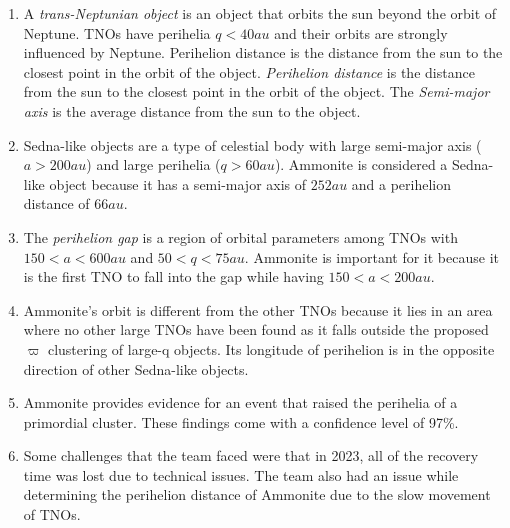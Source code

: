 \documentclass{article}
\theoremstyle{plain}
\begin{document}
\begin{enumerate}
          \begin{enumerate}[label=(\alph*)]
              \item A \textit{trans-Neptunian object} is an object that orbits the sun beyond the orbit of Neptune. TNOs have perihelia $q < 40 au$ and their orbits are strongly influenced by Neptune. Perihelion distance is the distance from the sun to the closest point in the orbit of the object. \textit{Perihelion distance} is the distance from the sun to the closest point in the orbit of the object. The \textit{Semi-major axis} is the average distance from the sun to the object.
              \item Sedna-like objects are a type of celestial body with large semi-major axis ($a > 200 au$) and large perihelia ($q > 60 au$). Ammonite is considered a Sedna-like object because it has a semi-major axis of $252 au$ and a perihelion distance of $66 au$.
              \item The \textit{perihelion gap} is a region of orbital parameters among TNOs with $150 < a < 600 au$ and $50 < q < 75 au$. Ammonite is important for it because it is the first TNO to fall into the gap while having $ 150 < a < 200 au$.
              \item Ammonite's orbit is different from the other TNOs because it lies in an area where no other large TNOs have been found as it falls outside the proposed $\varpi$ clustering of large-q objects. Its longitude of perihelion is in the opposite direction of other Sedna-like objects.
              \item Ammonite provides evidence for an event that raised the perihelia of a primordial cluster. These findings come with a confidence level of 97\%.
              \item Some challenges that the team faced were that in 2023, all of the recovery time was lost due to technical issues. The team also had an issue while determining the perihelion distance of Ammonite due to the slow movement of TNOs.
          \end{enumerate}

\end{enumerate}
\end{document}
